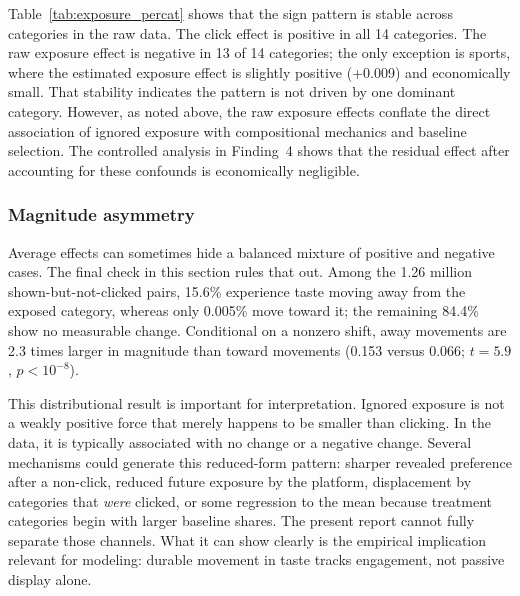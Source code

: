 \documentclass[11pt]{article}
\begin{document}
Table~\ref{tab:exposure_percat} shows that the sign pattern is stable across categories in the raw data. The click effect is positive in all 14 categories. The raw exposure effect is negative in 13 of 14 categories; the only exception is sports, where the estimated exposure effect is slightly positive (+0.009) and economically small. That stability indicates the pattern is not driven by one dominant category. However, as noted above, the raw exposure effects conflate the direct association of ignored exposure with compositional mechanics and baseline selection. The controlled analysis in Finding~4 shows that the residual effect after accounting for these confounds is economically negligible.

\subsubsection{Magnitude asymmetry}

Average effects can sometimes hide a balanced mixture of positive and negative cases. The final check in this section rules that out. Among the 1.26 million shown-but-not-clicked pairs, 15.6\% experience taste moving away from the exposed category, whereas only 0.005\% move toward it; the remaining 84.4\% show no measurable change. Conditional on a nonzero shift, away movements are 2.3 times larger in magnitude than toward movements (0.153 versus 0.066; $t = 5.9$, $p < 10^{-8}$).

This distributional result is important for interpretation. Ignored exposure is not a weakly positive force that merely happens to be smaller than clicking. In the data, it is typically associated with no change or a negative change. Several mechanisms could generate this reduced-form pattern: sharper revealed preference after a non-click, reduced future exposure by the platform, displacement by categories that \emph{were} clicked, or some regression to the mean because treatment categories begin with larger baseline shares. The present report cannot fully separate those channels. What it can show clearly is the empirical implication relevant for modeling: durable movement in taste tracks engagement, not passive display alone.


\end{document}
